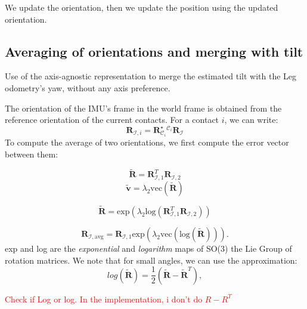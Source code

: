 \documentclass{IJCAS}
\begin{document}
We update the orientation, then we update the position using the updated orientation.
\subsection{Averaging of orientations and merging with tilt}
Use of the axis-agnostic representation to merge the estimated tilt with the Leg odometry's yaw, without any axis preference.

The orientation of the IMU's frame in the world frame is obtained from the reference orientation of the current contacts. For a contact $i$, we can write:
\begin{equation}
    \boldsymbol{R}_{\mathcal{I}, i} = \boldsymbol{R}^{\star}_{\mathcal{C}_{i}} {}^{\mathcal{C}_{i}} \boldsymbol{R}_{\mathcal{I}} 
\end{equation}
To compute the average of two orientations, we first compute the error vector between them:

\begin{equation}
    \tilde{\boldsymbol{R}} = \boldsymbol{R}^{T}_{\mathcal{I}, 1} \boldsymbol{R}_{\mathcal{I}, 2}
\end{equation}
\begin{equation}
    \tilde{\boldsymbol{v}} = \lambda_{2} \text{vec} \left(\tilde{\boldsymbol{R}}\right)
\end{equation}



\begin{equation}
    \tilde{\boldsymbol{R}} = \text{exp} \left( \lambda_{2} \text{log} \left( \boldsymbol{R}^{T}_{\mathcal{I}, 1} \boldsymbol{R}_{\mathcal{I}, 2} \right) \right)
\end{equation}

\begin{equation}
\boldsymbol{R}_{\mathcal{I}, \text{avg}} = \boldsymbol{R}_{\mathcal{I}, 1} \text{exp} \left( \lambda_{2} \text{vec}\left(\text{log} \left( \tilde{\boldsymbol{R}}\right)\right)  \right).
\end{equation}
exp and log are the \emph{exponential} and \emph{logarithm} maps of SO(3) the Lie Group of rotation matrices. We note that for small angles, we can use the approximation:
\begin{equation}
log\left(\tilde{\boldsymbol{R}}\right) = \frac{1}{2} \left(\tilde{\boldsymbol{R}}-\tilde{\boldsymbol{R}}^{T}\right), \label{eq:log_small}
\end{equation}

\textcolor{red}{Check if Log or log.}
\textcolor{red}{In the implementation, i don't do $R-R^T$}
\end{document}
